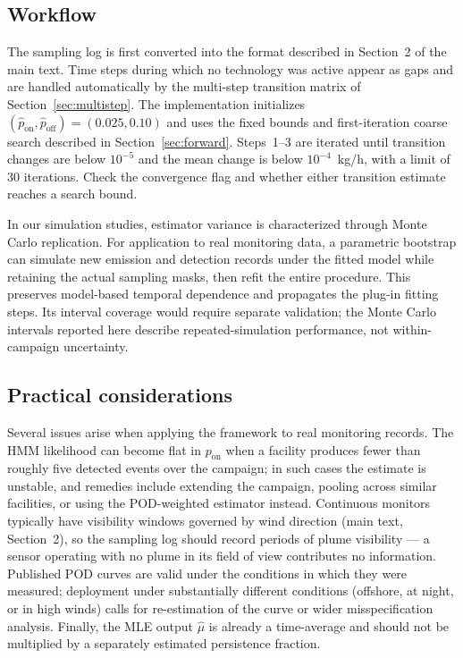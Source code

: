 \documentclass[11pt]{article}
\newcommand{\new}[1]{#1}
\begin{document}
\subsection{Workflow}
\new{The sampling log is first converted into the format described in Section~2 of the main text. Time steps during which no technology was active appear as gaps and are handled automatically by the multi-step transition matrix of Section~\ref{sec:multistep}. The implementation initializes $(\hat p_{\text{on}},\hat p_{\text{off}})=(0.025,0.10)$ and uses the fixed bounds and first-iteration coarse search described in Section~\ref{sec:forward}. Steps~1--3 are iterated until transition changes are below $10^{-5}$ and the mean change is below $10^{-4}$~kg/h, with a limit of 30 iterations. Check the convergence flag and whether either transition estimate reaches a search bound.}

\new{In our simulation studies, estimator variance is characterized through Monte Carlo replication. For application to real monitoring data, a parametric bootstrap can simulate new emission and detection records under the fitted model while retaining the actual sampling masks, then refit the entire procedure. This preserves model-based temporal dependence and propagates the plug-in fitting steps. Its interval coverage would require separate validation; the Monte Carlo intervals reported here describe repeated-simulation performance, not within-campaign uncertainty.}

\subsection{Practical considerations}
\new{Several issues arise when applying the framework to real monitoring records. The HMM likelihood can become flat in $p_{\text{on}}$ when a facility produces fewer than roughly five detected events over the campaign; in such cases the estimate is unstable, and remedies include extending the campaign, pooling across similar facilities, or using the POD-weighted estimator instead. Continuous monitors typically have visibility windows governed by wind direction (main text, Section~2), so the sampling log should record periods of plume visibility — a sensor operating with no plume in its field of view contributes no information. Published POD curves are valid under the conditions in which they were measured; deployment under substantially different conditions (offshore, at night, or in high winds) calls for re-estimation of the curve or wider misspecification analysis. Finally, the MLE output $\hat\mu$ is already a time-average and should not be multiplied by a separately estimated persistence fraction.}
\end{document}
